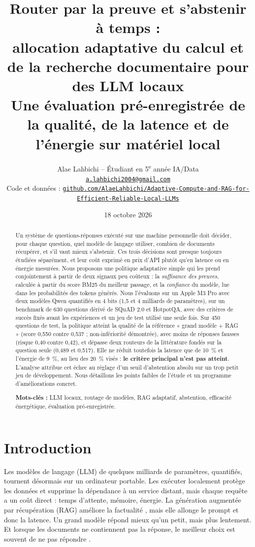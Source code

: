 \documentclass[11pt,a4paper]{article}
\title{\textbf{Router par la preuve et s'abstenir à temps :\\ allocation adaptative du calcul et de la
recherche documentaire pour des LLM locaux}\\[6pt]
\large Une évaluation pré-enregistrée de la qualité, de la latence et de l'énergie sur matériel local}
\author{Alae Lahbichi -- Étudiant en 5\textsuperscript{e} année IA/Data\\[2pt]
\small\href{mailto:a.lahbichi2004@gmail.com}{\texttt{a.lahbichi2004@gmail.com}}\\
\small Code et données : \href{https://github.com/AlaeLahbichi/Adaptive-Compute-and-RAG-for-Efficient-Reliable-Local-LLMs}{\footnotesize\texttt{github.com/AlaeLahbichi/Adaptive-Compute-and-RAG-for-Efficient-Reliable-Local-LLMs}}}
\date{18 octobre 2026}
\begin{document}
\maketitle

\begin{abstract}
\noindent Un système de questions-réponses exécuté sur une machine personnelle doit décider, pour
chaque question, quel modèle de langage utiliser, combien de documents récupérer, et s'il vaut mieux
s'abstenir. Ces trois décisions sont presque toujours étudiées séparément, et leur coût exprimé en prix
d'API plutôt qu'en latence ou en énergie mesurées. Nous proposons une politique adaptative simple qui
les prend conjointement à partir de deux signaux peu coûteux : la \emph{suffisance des preuves},
calculée à partir du score BM25 du meilleur passage, et la \emph{confiance} du modèle, lue dans les
probabilités des tokens générés. Nous l'évaluons sur un Apple M3 Pro avec deux modèles Qwen quantifiés
en 4 bits (1,5 et 4 milliards de paramètres), sur un benchmark de 630 questions dérivé de SQuAD 2.0 et
HotpotQA, avec des critères de succès fixés avant les expériences et un jeu de test utilisé une seule
fois. Sur 450 questions de test, la politique atteint la qualité de la référence « grand modèle + RAG »
(score 0,550 contre 0,537 ; non-infériorité démontrée), avec moins de réponses fausses (risque 0,40
contre 0,42), et dépasse deux routeurs de la littérature fondés sur la question seule (0,489 et 0,517).
Elle ne réduit toutefois la latence que de 10~\% et l'énergie de 9~\%, au lieu des 20~\% visés :
\textbf{le critère principal n'est pas atteint}. L'analyse attribue cet échec au réglage d'un seuil
d'abstention absolu sur un trop petit jeu de développement. Nous détaillons les points faibles de
l'étude et un programme d'améliorations concret.

\medskip
\noindent\textbf{Mots-clés :} LLM locaux, routage de modèles, RAG adaptatif, abstention, efficacité
énergétique, évaluation pré-enregistrée.
\end{abstract}

\section{Introduction}\label{sec:intro}

Les modèles de langage (LLM) de quelques milliards de paramètres, quantifiés, tournent désormais sur un
ordinateur portable. Les exécuter localement protège les données et supprime la dépendance à un service
distant, mais chaque requête a un coût direct : temps d'attente, mémoire, énergie. La génération
augmentée par récupération (RAG) améliore la factualité \citep{gao2023ragsurvey}, mais elle allonge le
prompt et donc la latence. Un grand modèle répond mieux qu'un petit, mais plus lentement. Et lorsque
les documents ne contiennent pas la réponse, le meilleur choix est souvent de ne pas répondre
\citep{wen2024abstention}.
\end{document}
